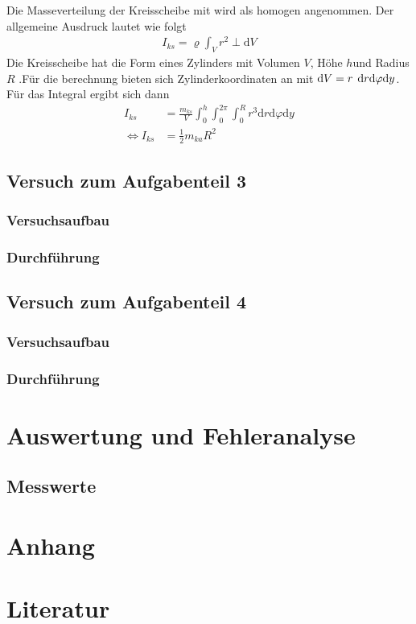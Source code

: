 \documentclass[11pt,a4paper]{article}
\begin{document}
Die Masseverteilung der Kreisscheibe mit wird als homogen angenommen. Der allgemeine Ausdruck lautet wie folgt
\begin{align}
	I_{ks} = \varrho\int_{V}^{}r^2\perp\mathrm{d}V
\end{align}
Die Kreisscheibe hat die Form eines Zylinders mit Volumen $V $, Höhe $h$und Radius $R$ .Für die berechnung bieten sich Zylinderkoordinaten an mit $\mathrm{d}V=r\hspace{0.15cm}\mathrm{d}r\mathrm{d}\varphi\mathrm{d}y$.
Für das Integral ergibt sich dann
\begin{align}
	I_{ks} &= \frac{m_{ks}}{V} \int_{0}^{h}\int_{0}^{2\pi}\int_{0}^{R} r^3 \mathrm{d}r\mathrm{d}\varphi\mathrm{d}y \\
	\Leftrightarrow I_{ks} &= \frac{1}{2} m_{ka}R^2
\end{align}







\subsection{Versuch zum Aufgabenteil 3}
      \subsubsection{Versuchsaufbau}
      \subsubsection{Durchführung}

\subsection{Versuch zum Aufgabenteil 4}
     \subsubsection{Versuchsaufbau}
     \subsubsection{Durchführung}
\section{Auswertung und Fehleranalyse}
\subsection{Messwerte}



\newpage
\section{Anhang}
%

\nocite{*}
\newpage
\section{Literatur}
\newpage
%
\end{document}
